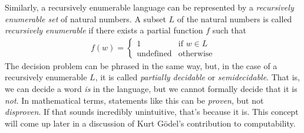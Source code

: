 Similarly, a recursively enumerable language can be represented by a \textit{recursively enumerable set} of natural numbers. A subset $L$ of the natural numbers is called \textit{recursively enumerable} if there exists a partial function $f$ such that
\begin{align*}
f(w)=
\begin{cases}
1 & \text{if } w\in L \\
\text{undefined} & \text{otherwise}
\end{cases}
\end{align*}
The decision problem can be phrased in the same way, but, in the case of a recursively enumerable $L$, it is called \textit{partially decidable} or \textit{semidecidable}. That is, we can decide a word \textit{is} in the language, but we cannot formally decide that it is \textit{not}. In mathematical terms, statements like this can be \textit{proven}, but not \textit{disproven}. If that sounds incredibly unintuitive, that's because it is. This concept will come up later in a discussion of Kurt G\"odel's contribution to computability. \\\\

